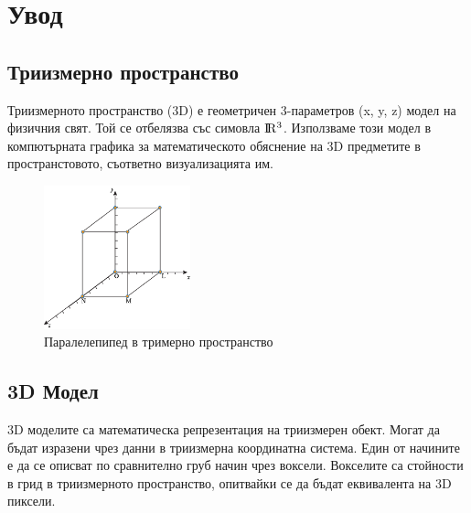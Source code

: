 \section{Увод}

\subsection{Триизмерно пространство}
Триизмерното пространство (3D) е геометричен 3-параметров (x, y, z) модел на физичния свят. Той се отбелязва със симовла ${\rm I\!R^3}$. Използваме този модел в компютърната графика за математическото обяснение на 3D предметите в пространстовото, съответно визуализацията им.

\begin{center}
\begin{figure}[h]
    \centering
    \includegraphics[width=120pt]{3dcube.png}
    \caption{Паралелепипед в тримерно пространство}
    \label{fig:mesh1}
\end{figure}
\end{center}

\subsection{3D Модел}
3D моделите са математическа репрезентация на триизмерен обект. Могат да бъдат изразени чрез данни в триизмерна координатна система. Един от начините е да се описват по сравнително груб начин чрез воксели. Вокселите са стойности в грид в триизмерното пространство, опитвайки се да бъдат еквивалента на 3D пиксели. 

